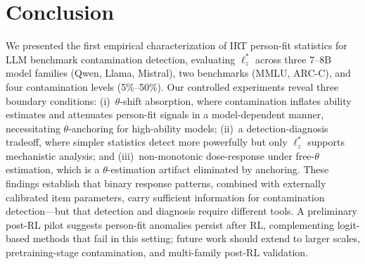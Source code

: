 \section{Conclusion}\label{sec:conclusion}

We presented the first empirical characterization of IRT person-fit statistics for LLM benchmark contamination detection, evaluating $\ell_z^*$ across three 7--8B model families (Qwen, Llama, Mistral), two benchmarks (MMLU, ARC-C), and four contamination levels (5\%--50\%).
Our controlled experiments reveal three boundary conditions: (i)~$\theta$-shift absorption, where contamination inflates ability estimates and attenuates person-fit signals in a model-dependent manner, necessitating $\theta$-anchoring for high-ability models; (ii)~a detection-diagnosis tradeoff, where simpler statistics detect more powerfully but only $\ell_z^*$ supports mechanistic analysis; and (iii)~non-monotonic dose-response under free-$\theta$ estimation, which is a $\theta$-estimation artifact eliminated by anchoring.
These findings establish that binary response patterns, combined with externally calibrated item parameters, carry sufficient information for contamination detection---but that detection and diagnosis require different tools.
A preliminary post-RL pilot suggests person-fit anomalies persist after RL, complementing logit-based methods that fail in this setting; future work should extend to larger scales, pretraining-stage contamination, and multi-family post-RL validation.
